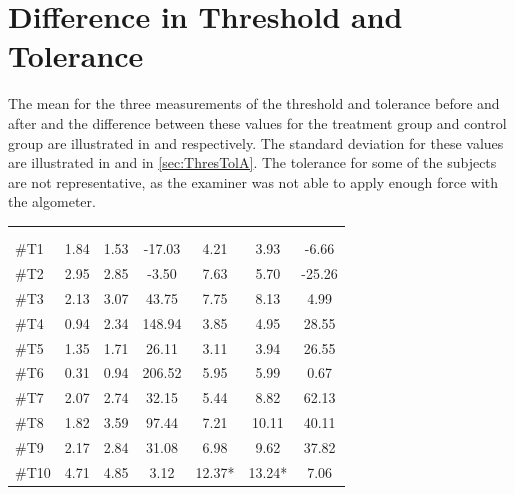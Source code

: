\section{Difference in Threshold and Tolerance}
The mean for the three measurements of the threshold and tolerance before and after and the difference between these values for the treatment group and control group are illustrated in   and  respectively. The standard deviation for these values are illustrated in  and  in \autoref{sec:ThresTolA}. The tolerance for some of the subjects are not representative, as the examiner was not able to apply enough force with the algometer. 

\begin{longtable} {l|c|c|c|c|c|c}
 \rowcolor[HTML]{C0C0C0} 
  \color[HTML]{000000}{} & 
 \multicolumn{3}{c|}{ \color[HTML]{000000}{\textbf{Threshold}}} & \multicolumn{3}{c}{ \color[HTML]{000000}{\textbf{Tolerance}}}  	\\  \rule{0pt}{3ex} 
  \cellcolor[HTML]{C0C0C0}{} &
 \multicolumn{1}{c|}{ \cellcolor[HTML]{C0C0C0}{Pre [KgF]}} & \multicolumn{1}{c|}{ \cellcolor[HTML]{C0C0C0}{Post [KgF]}} 
 & \multicolumn{1}{c}{ \cellcolor[HTML]{C0C0C0}{\textcolor[HTML]{C0C0C0}{0}Diff [\%]\textcolor[HTML]{C0C0C0}{0}}}
 & \multicolumn{1}{|c|}{ \cellcolor[HTML]{C0C0C0}{Pre [KgF]}} 
 & \multicolumn{1}{c|}{ \cellcolor[HTML]{C0C0C0}{Post [KgF]}} 
 & \multicolumn{1}{c}{ \cellcolor[HTML]{C0C0C0}{\textcolor[HTML]{C0C0C0}{0}Diff [\%]\textcolor[HTML]{C0C0C0}{0}}}  	\\ \hline 
\#T1 & 1.84 & 1.53 & -17.03 & 4.21 & 3.93 & -6.66 \\ \hline
\#T2 & 2.95 & 2.85  & -3.50 & 7.63  & 5.70 & -25.26 \\ \hline
\#T3 & 2.13 & 3.07 & 43.75 & 7.75 & 8.13 & 4.99 \\ \hline
\#T4 & 0.94 & 2.34  & 148.94  & 3.85 & 4.95 & 28.55 \\ \hline
\#T5 & 1.35 & 1.71  & 26.11 & 3.11 & 3.94 & 26.55 \\ \hline	
\#T6 & 0.31 & 0.94   & 206.52 & 5.95 & 5.99 & 0.67 \\ \hline
\#T7 & 2.07 & 2.74  & 32.15 & 5.44 & 8.82 & 62.13 \\ \hline
\#T8 & 1.82 & 3.59 & 97.44 & 7.21 & 10.11 & 40.11 \\ \hline
\#T9 & 2.17 & 2.84  & 31.08 & 6.98 & 9.62 & 37.82 \\ \hline
\#T10 & 4.71 & 4.85  & 3.12 & 12.37*  & 13.24* & 7.06 \\ \hline

\end{longtable}

